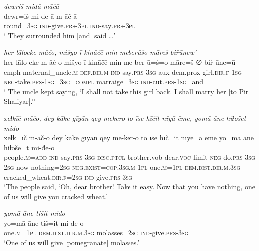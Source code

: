 \ea \label{ŽP.224}
\textit{dewriš miđā māčā} \\ 
\gll dewr=iš mi-đe-ā m-āč-ā \\ 
 round\textsc{=3sg} \textsc{ind-}give\textsc{.prs}\textsc{-3pl} \textsc{ind-}say\textsc{.prs}\textsc{-3pl} \\ 
\glt ` They surrounded him [and] said …'
\z 
 
\ea \label{ŽP.225}
\textit{her lāloeke māčo, mišyo ī kināčē min meberūšo māreš biřūnew’} \\ 
\gll her lālo-eke m-āč-o mišyo ī kināčē min me-ber-ū=š=o māre=š ∅-biř-ūne=ū \\ 
 emph maternal\_uncle\textsc{.m}\textsc{-def}\textsc{.dir}\textsc{.m} \textsc{ind-}say\textsc{.prs}\textsc{-3sg} aux dem.prox girl\textsc{.dir}\textsc{.f} \textsc{1sg} \textsc{neg-}take\textsc{.prs}\textsc{-\textsc{1sg}}\textsc{=3sg}\textsc{=compl} marraige\textsc{=3sg} \textsc{ind-}cut\textsc{.prs}\textsc{-\textsc{1sg}}=and \\ 
\glt ` The uncle kept saying, ‘I shall not take this girl back. I shall marry her [to Pir Shaliyar].’'
\z 
 
\ea \label{ŽP.227}
\textit{xeɫkīč māčo, dey kāke gīyān qey mekero to īse hīčit nīyā ēme, yomā āne hiɫošet miđo} \\ 
\gll xeɫk=īč m-āč-o dey kāke gīyān qey me-ker-o to īse hīč=it nīye=ā ēme yo=mā āne hiɫoše=t mi-đe-o \\ 
 people\textsc{.m}\textsc{=add} \textsc{ind-}say\textsc{.prs}\textsc{-3sg} \textsc{disc.ptcl} brother.vob dear.\textsc{voc} limit \textsc{neg-}do\textsc{.prs}\textsc{-3sg} \textsc{2sg} now nothing\textsc{=\textsc{2sg}} \textsc{\textsc{neg.}exist}\textsc{=cop}\textsc{.3sg}\textsc{.m} \textsc{1pl} one\textsc{.m}\textsc{=1pl} \textsc{dem.dist}\textsc{.dir}\textsc{.m}\textsc{.3sg} cracked\_wheat\textsc{.dir}\textsc{.f}\textsc{=\textsc{2sg}} \textsc{ind-}give\textsc{.prs}\textsc{-3sg} \\ 
\glt `The people said, ‘Oh, dear brother! Take it easy. Now that you have nothing, one of us will give you cracked wheat.'
\z 
 
\ea \label{ŽP.228}
\textit{yomā āne tišit miđo} \\ 
\gll yo=mā āne tiš=it mi-đe-o \\ 
 one\textsc{.m}\textsc{=1pl} \textsc{dem.dist}\textsc{.dir}\textsc{.m}\textsc{.3sg} molasses\textsc{=\textsc{2sg}} \textsc{ind-}give\textsc{.prs}\textsc{-3sg} \\ 
\glt `One of us will give [pomegranate] molasses.'
\z 
 
